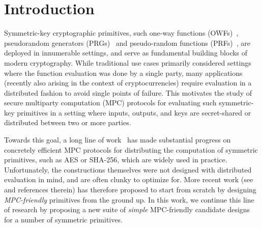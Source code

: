 
\section{Introduction}
\label{sec:introduction}

Symmetric-key cryptographic primitives, such one-way functions (OWFs)~\cite{levin1985-owf},
 pseudorandom generators (PRGs)~\cite{blum1984-prg,yao1982-prg}
and pseudo-random functions (PRFs)~\cite{goldreich1984-prf}, are deployed in innumerable settings, and serve as fundamental building blocks of modern cryptography. While traditional use cases primarily considered settings where the function evaluation was done by a single party, many applications (recently also arising in the context of cryptocurrencies)
require evaluation in a distributed fashion to avoid single points of failure. This motivates the study of secure multiparty computation (MPC) protocols for evaluating such symmetric-key primitives in a setting where inputs, outputs, and keys are secret-shared or distributed between two or more parties.

Towards this goal, a long line of work~\cite{damgard2010-aes, pinkas2009-aes, wang2017-mpc} has made substantial progress on concretely efficient MPC protocols for distributing the computation of symmetric primitives, such as AES or SHA-256, which are widely used in practice. Unfortunately, the constructions themselves were not designed with distributed evaluation in mind, and are often clunky to optimize for. More recent work (see~\cite{albrecht2015-lowmc, grassi2016-mpcfriendly, boneh2018-darkmatter,albrecht2019-feistal-mpc, aly2020-design-mpc} and references therein) has therefore proposed to start from scratch by designing \textit{MPC-friendly} primitives from the ground up. 
In this work, we continue this line of research by proposing a new suite of \textit{simple} MPC-friendly candidate designs for a number of symmetric primitives.



